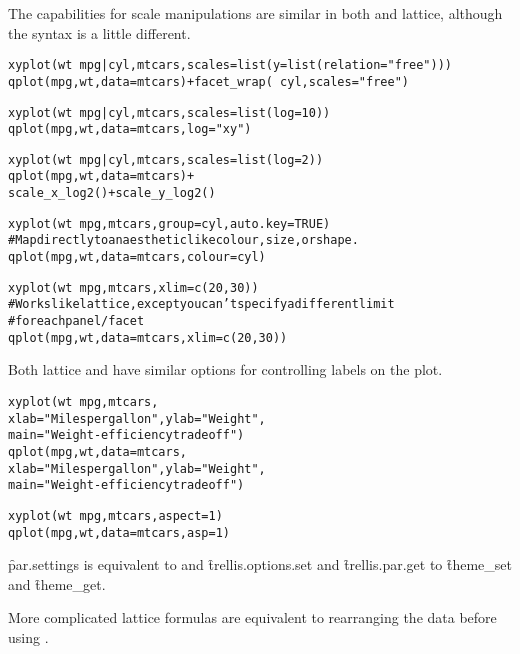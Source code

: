 The capabilities for scale manipulations are similar in both \ggplot and lattice, although the syntax is a little different.

\begin{alltt}
xyplot(wt ~ mpg | cyl, mtcars, scales = list(y = list(relation = "free")))
qplot(mpg, wt, data = mtcars) + facet_wrap(~ cyl, scales = "free")

xyplot(wt ~ mpg | cyl, mtcars, scales = list(log = 10))
qplot(mpg, wt, data = mtcars, log = "xy") 

xyplot(wt ~ mpg | cyl, mtcars, scales = list(log = 2))
qplot(mpg, wt, data = mtcars) + 
  scale_x_log2() + scale_y_log2()

xyplot(wt ~ mpg, mtcars, group = cyl, auto.key = TRUE)
# Map directly to an aesthetic like colour, size, or shape.
qplot(mpg, wt, data = mtcars, colour = cyl)

xyplot(wt ~ mpg, mtcars, xlim = c(20,30))
# Works like lattice, except you can't specify a different limit 
# for each panel/facet
qplot(mpg, wt, data = mtcars, xlim = c(20,30))
\end{alltt}

Both lattice and \ggplot have similar options for controlling labels on the plot.

\begin{alltt}
xyplot(wt ~ mpg, mtcars, 
  xlab = "Miles per gallon", ylab = "Weight", 
  main = "Weight-efficiency tradeoff")
qplot(mpg, wt, data = mtcars, 
  xlab = "Miles per gallon", ylab = "Weight", 
  main = "Weight-efficiency tradeoff")

xyplot(wt ~ mpg, mtcars, aspect = 1) 
qplot(mpg, wt, data = mtcars, asp = 1)
\end{alltt}

\f{par.settings} is equivalent to  and \f{trellis.options.set} and \f{trellis.par.get} to \f{theme_set} and \f{theme_get}.


More complicated lattice formulas are equivalent to rearranging the data before using \ggplot.

% 
% 
% 
% 
% 
% 
% 

